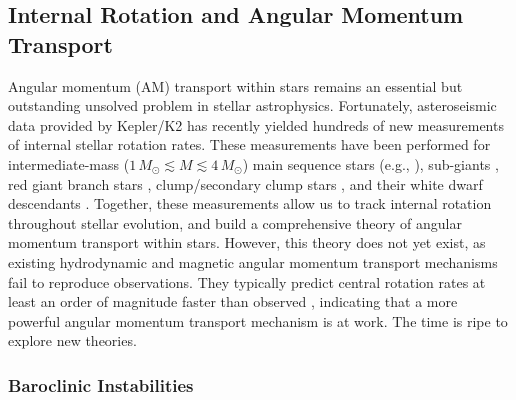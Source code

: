 
{\color{orange}
\subsection{Internal Rotation and Angular Momentum Transport}





Angular momentum (AM) transport within stars remains an essential but outstanding unsolved problem in stellar astrophysics. Fortunately, asteroseismic data provided by Kepler/K2 has recently yielded hundreds of new measurements of internal stellar rotation rates. These measurements have been performed for intermediate-mass ($1 \, M_\odot \! \lesssim \! M \! \lesssim \! 4 \, M_\odot$) main sequence stars (e.g., \citealt{benomar:15,vanreeth:16}), sub-giants \citep{deheuvels:14}, red giant branch stars \citep{beck:12,mosser:12}, clump/secondary clump stars \citep{mosser:12,deheuvels:15}, and their white dwarf descendants \citep{hermes:17}. Together, these measurements allow us to track internal rotation throughout stellar evolution, and build a comprehensive theory of angular momentum transport within stars. However, this theory does not yet exist, as existing hydrodynamic and magnetic angular momentum transport mechanisms fail to reproduce observations. They typically predict central rotation rates at least an order of magnitude faster than observed \citep{cantiello:14,fullerwave:14}, indicating that a more powerful angular momentum transport mechanism is at work. The time is ripe to explore new theories.



\subsubsection{Baroclinic Instabilities}

}
